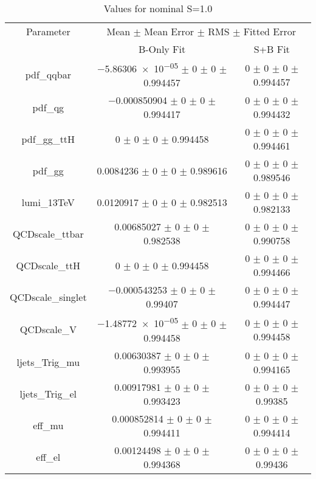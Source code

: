 \begin{table}
\centering
\caption{Values for nominal S=1.0}
\begin{tabular}{ccc}
\toprule
Parameter 	& \multicolumn{2}{c}{Mean $\pm$ Mean Error $\pm$ RMS $\pm$ Fitted Error}\\
 	& B-Only Fit & S+B Fit\\
\midrule
pdf\_qqbar 	& \num{-5.86306e-05} $\pm$ \num{0} $\pm$ \num{0} $\pm$ \num{0.994457} 	& \num{0} $\pm$ \num{0} $\pm$ \num{0} $\pm$ \num{0.994457}\\
pdf\_qg 	& \num{-0.000850904} $\pm$ \num{0} $\pm$ \num{0} $\pm$ \num{0.994417} 	& \num{0} $\pm$ \num{0} $\pm$ \num{0} $\pm$ \num{0.994432}\\
pdf\_gg\_ttH 	& \num{0} $\pm$ \num{0} $\pm$ \num{0} $\pm$ \num{0.994458} 	& \num{0} $\pm$ \num{0} $\pm$ \num{0} $\pm$ \num{0.994461}\\
pdf\_gg 	& \num{0.0084236} $\pm$ \num{0} $\pm$ \num{0} $\pm$ \num{0.989616} 	& \num{0} $\pm$ \num{0} $\pm$ \num{0} $\pm$ \num{0.989546}\\
lumi\_13TeV 	& \num{0.0120917} $\pm$ \num{0} $\pm$ \num{0} $\pm$ \num{0.982513} 	& \num{0} $\pm$ \num{0} $\pm$ \num{0} $\pm$ \num{0.982133}\\
QCDscale\_ttbar 	& \num{0.00685027} $\pm$ \num{0} $\pm$ \num{0} $\pm$ \num{0.982538} 	& \num{0} $\pm$ \num{0} $\pm$ \num{0} $\pm$ \num{0.990758}\\
QCDscale\_ttH 	& \num{0} $\pm$ \num{0} $\pm$ \num{0} $\pm$ \num{0.994458} 	& \num{0} $\pm$ \num{0} $\pm$ \num{0} $\pm$ \num{0.994466}\\
QCDscale\_singlet 	& \num{-0.000543253} $\pm$ \num{0} $\pm$ \num{0} $\pm$ \num{0.99407} 	& \num{0} $\pm$ \num{0} $\pm$ \num{0} $\pm$ \num{0.994447}\\
QCDscale\_V 	& \num{-1.48772e-05} $\pm$ \num{0} $\pm$ \num{0} $\pm$ \num{0.994458} 	& \num{0} $\pm$ \num{0} $\pm$ \num{0} $\pm$ \num{0.994458}\\
ljets\_Trig\_mu 	& \num{0.00630387} $\pm$ \num{0} $\pm$ \num{0} $\pm$ \num{0.993955} 	& \num{0} $\pm$ \num{0} $\pm$ \num{0} $\pm$ \num{0.994165}\\
ljets\_Trig\_el 	& \num{0.00917981} $\pm$ \num{0} $\pm$ \num{0} $\pm$ \num{0.993423} 	& \num{0} $\pm$ \num{0} $\pm$ \num{0} $\pm$ \num{0.99385}\\
eff\_mu 	& \num{0.000852814} $\pm$ \num{0} $\pm$ \num{0} $\pm$ \num{0.994411} 	& \num{0} $\pm$ \num{0} $\pm$ \num{0} $\pm$ \num{0.994414}\\
eff\_el 	& \num{0.00124498} $\pm$ \num{0} $\pm$ \num{0} $\pm$ \num{0.994368} 	& \num{0} $\pm$ \num{0} $\pm$ \num{0} $\pm$ \num{0.99436}\\

\end{tabular}
\end{table}
